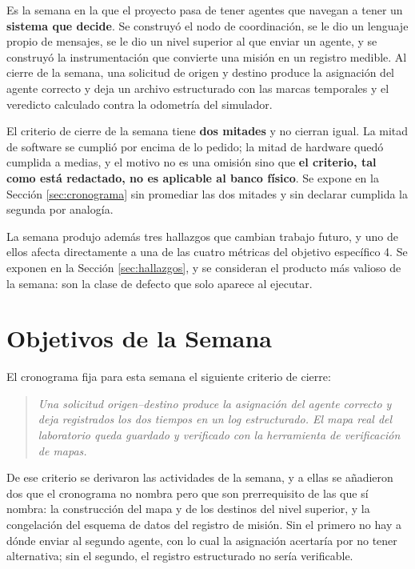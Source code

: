 \documentclass[12pt,letterpaper]{article}
\begin{document}
Es la semana en la que el proyecto pasa de tener agentes que navegan a tener un \textbf{sistema que decide}. Se construyó el nodo de coordinación, se le dio un lenguaje propio de mensajes, se le dio un nivel superior al que enviar un agente, y se construyó la instrumentación que convierte una misión en un registro medible. Al cierre de la semana, una solicitud de origen y destino produce la asignación del agente correcto y deja un archivo estructurado con las marcas temporales y el veredicto calculado contra la odometría del simulador.

El criterio de cierre de la semana tiene \textbf{dos mitades} y no cierran igual. La mitad de software se cumplió por encima de lo pedido; la mitad de hardware quedó cumplida a medias, y el motivo no es una omisión sino que \textbf{el criterio, tal como está redactado, no es aplicable al banco físico}. Se expone en la Sección \ref{sec:cronograma} sin promediar las dos mitades y sin declarar cumplida la segunda por analogía.

La semana produjo además tres hallazgos que cambian trabajo futuro, y uno de ellos afecta directamente a una de las cuatro métricas del objetivo específico 4. Se exponen en la Sección \ref{sec:hallazgos}, y se consideran el producto más valioso de la semana: son la clase de defecto que solo aparece al ejecutar.

\section{Objetivos de la Semana}

El cronograma fija para esta semana el siguiente criterio de cierre:

\begin{quote}
\textit{Una solicitud origen--destino produce la asignación del agente correcto y deja registrados los dos tiempos en un log estructurado. El mapa real del laboratorio queda guardado y verificado con la herramienta de verificación de mapas.}
\end{quote}

De ese criterio se derivaron las actividades de la semana, y a ellas se añadieron dos que el cronograma no nombra pero que son prerrequisito de las que sí nombra: la construcción del mapa y de los destinos del nivel superior, y la congelación del esquema de datos del registro de misión. Sin el primero no hay a dónde enviar al segundo agente, con lo cual la asignación acertaría por no tener alternativa; sin el segundo, el registro estructurado no sería verificable.
\end{document}
